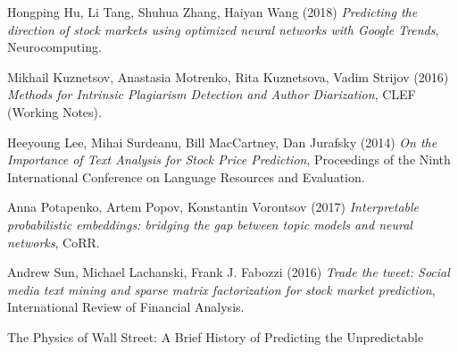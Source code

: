 \documentclass[12pt, twoside]{article}
\begin{document}
\begin{thebibliography}{9}
Hongping Hu, Li Tang, Shuhua Zhang, Haiyan Wang (2018) \emph{Predicting the direction of stock markets using optimized neural networks with Google Trends}, Neurocomputing.

Mikhail Kuznetsov, Anastasia Motrenko, Rita Kuznetsova, Vadim Strijov (2016) \emph{Methods for Intrinsic Plagiarism Detection and Author Diarization}, CLEF (Working Notes).

Heeyoung Lee, Mihai Surdeanu, Bill MacCartney, Dan Jurafsky (2014) \emph{On the Importance of Text Analysis for Stock Price Prediction}, Proceedings of the Ninth International Conference on Language Resources and Evaluation.

Anna Potapenko, Artem Popov, Konstantin Vorontsov (2017) \emph{Interpretable probabilistic embeddings: bridging the gap between topic models and neural networks}, CoRR.

Andrew Sun, Michael Lachanski, Frank J. Fabozzi (2016) \emph{Trade the tweet: Social media text mining and sparse matrix factorization for stock market prediction}, International Review of Financial Analysis.

The Physics of Wall Street: A Brief History of Predicting the Unpredictable
\bibitem{}
\end{thebibliography}
\end{document}
